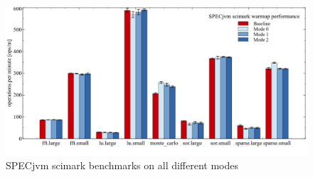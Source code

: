 \begin{figure}[ht]
  \begin{center}
    \centering
    \includegraphics[width=1.0\textwidth]{figures/scimark_warmup.png}
    \caption{SPECjvm scimark benchmarks on all different modes}
    \label{f:scimark_warmup}
  \end{center}
\end{figure}

